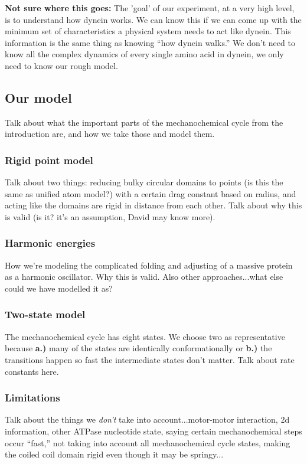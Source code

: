 \documentclass[10pt]{article} %
\begin{document}
\textbf{Not sure where this goes:} The 'goal' of our experiment, at a very high level, is to
understand how dynein works. We can know this if we can come up with the minimum set of characteristics a physical system needs to act like dynein. This information is the same thing as knowing
``how dynein walks.'' We don't need to know all the complex dynamics of every single amino acid in
dynein, we only need to know our rough model.\\

\subsection{Our model}
Talk about what the important parts of the mechanochemical cycle from the introduction are, and how
we take those and model them.\\
\subsubsection{Rigid point model}
Talk about two things: reducing bulky circular domains to points (is this the same as unified atom
model?) with a certain drag constant based on radius, and acting like the domains are rigid in
distance from each other. Talk about why this is valid (is it? it's an assumption, David may know
more).
\subsubsection{Harmonic energies}
How we're modeling the complicated folding and adjusting of a massive protein as a harmonic
oscillator. Why this is valid. Also other approaches...what else could we have modelled it as?
\subsubsection{Two-state model}
The mechanochemical cycle has eight states. We choose two as representative because \textbf{a.)}
many of the states are identically conformationally or \textbf{b.)} the transitions happen so fast
the intermediate states don't matter. Talk about rate constants here.
\subsubsection{Limitations}
Talk about the things we \textit{don't} take into account...motor-motor interaction, 2d information,
other ATPase nucleotide state, saying certain mechanochemical steps occur ``fast,'' not taking into
account all mechanochemical cycle states, making the coiled coil domain rigid even though it may be
springy...
\end{document}
